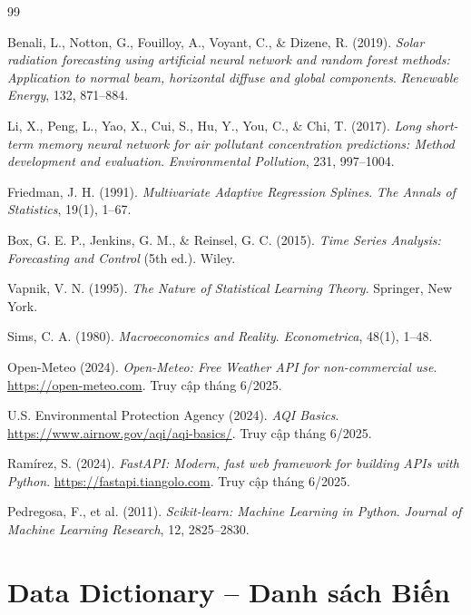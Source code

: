 \documentclass[12pt,a4paper]{report}
\begin{document}
\begin{thebibliography}{99}

Benali, L., Notton, G., Fouilloy, A., Voyant, C., \& Dizene, R. (2019).
\textit{Solar radiation forecasting using artificial neural network and random forest methods: Application to normal beam, horizontal diffuse and global components}.
\textit{Renewable Energy}, 132, 871--884.

Li, X., Peng, L., Yao, X., Cui, S., Hu, Y., You, C., \& Chi, T. (2017).
\textit{Long short-term memory neural network for air pollutant concentration predictions: Method development and evaluation}.
\textit{Environmental Pollution}, 231, 997--1004.

Friedman, J. H. (1991).
\textit{Multivariate Adaptive Regression Splines}.
\textit{The Annals of Statistics}, 19(1), 1--67.

Box, G. E. P., Jenkins, G. M., \& Reinsel, G. C. (2015).
\textit{Time Series Analysis: Forecasting and Control} (5th ed.).
Wiley.

Vapnik, V. N. (1995).
\textit{The Nature of Statistical Learning Theory}.
Springer, New York.

Sims, C. A. (1980).
\textit{Macroeconomics and Reality}.
\textit{Econometrica}, 48(1), 1--48.

Open-Meteo (2024).
\textit{Open-Meteo: Free Weather API for non-commercial use}.
\url{https://open-meteo.com}. Truy cập tháng 6/2025.

U.S. Environmental Protection Agency (2024).
\textit{AQI Basics}.
\url{https://www.airnow.gov/aqi/aqi-basics/}. Truy cập tháng 6/2025.

Ramírez, S. (2024).
\textit{FastAPI: Modern, fast web framework for building APIs with Python}.
\url{https://fastapi.tiangolo.com}. Truy cập tháng 6/2025.

Pedregosa, F., et al. (2011).
\textit{Scikit-learn: Machine Learning in Python}.
\textit{Journal of Machine Learning Research}, 12, 2825--2830.

\end{thebibliography}

\appendix
\chapter{Data Dictionary -- Danh sách Biến}
\end{document}
